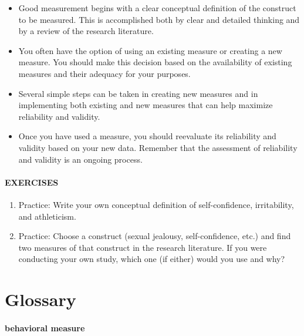 \documentclass[
]{krantz}
\providecommand{\tightlist}{%
  \setlength{\itemsep}{0pt}\setlength{\parskip}{0pt}}
\begin{document}
\begin{itemize}
\tightlist
\item
  Good measurement begins with a clear conceptual definition of the construct to be measured. This is accomplished both by clear and detailed thinking and by a review of the research literature.
\item
  You often have the option of using an existing measure or creating a new measure. You should make this decision based on the availability of existing measures and their adequacy for your purposes.
\item
  Several simple steps can be taken in creating new measures and in implementing both existing and new measures that can help maximize reliability and validity.
\item
  Once you have used a measure, you should reevaluate its reliability and validity based on your new data. Remember that the assessment of reliability and validity is an ongoing process.
\end{itemize}

\hypertarget{exercises-15}{%
\paragraph*{EXERCISES}\label{exercises-15}}

\begin{enumerate}
\def\labelenumi{\arabic{enumi}.}
\tightlist
\item
  Practice: Write your own conceptual definition of self-confidence, irritability, and athleticism.
\item
  Practice: Choose a construct (sexual jealousy, self-confidence, etc.) and find two measures of that construct in the research literature. If you were conducting your own study, which one (if either) would you use and why?
\end{enumerate}

\hypertarget{glossary-5}{%
\section{Glossary}\label{glossary-5}}

\hypertarget{behavioral-measure}{%
\paragraph*{behavioral measure}\label{behavioral-measure}}
\end{document}
